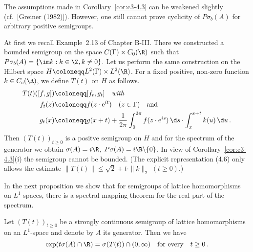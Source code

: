 The assumptions made in Corollary~\ref{cor:c3-4.3} can be weakened slightly (cf.\ [Greiner (1982)]). 
However, one still cannot prove cyclicity of $P\sigma_{b}(A)$ for arbitrary positive semigroups.

\begin{example}\label{ex:c3-4.4}
	At first we recall Example~2.13 of Chapter B-III. 
	There we constructed a bounded semigroup on the space $C(\Gamma)\times C_{0}(\R )$ such that $P\sigma_{b}(A) = \{\im k : k \in \Z, k \neq 0\}$.
%
%
%
Let us perform the same construction on the Hilbert space
$H \coloneqq L^2(\Gamma)\times L^2(\R )$.
For a fixed positive, non-zero function $k \in C_c(\R )$,
we define $T(t)$ on $H$ as follows.
\begin{equation}\label{eq:c3-4.6}
	\begin{aligned} 
		T(t)([f,g]) &\coloneqq [f_t,g_t] \quad \textit{with}\\
		f_t(z) &\coloneqq f(z \cdot \mathrm{e}^{it}) \quad (z \in \Gamma) \quad \text{and}\\
		g_t(x) &\coloneqq g(x+t) + \frac{1}{2\pi}\int_{0}^{2\pi} f(z \cdot \mathrm{e}^{is}) \,\d s \cdot \int_{x}^{x+t} k(u) \,\d u\,.
	\end{aligned}
\end{equation}
Then $(T(t))_{t \geq 0}$ is a positve semigroup on $H$ and for the spectrum of
the generator we obtain $\sigma(A) = i\R $, $P\sigma(A) = i\R \backslash\{0\}$.
In view of Corollary~\ref{cor:c3-4.3}(i) the semigroup cannot be bounded.
(The explicit representation (4.6) only allows the estimate $\|T(t)\| \leq \sqrt{2} + t \cdot \|k\|_2$ $(t\geq 0)$.)
\end{example}

In the next proposition we show that for semigroups of lattice homomorphisms on $L^1$-spaces, there is a spectral mapping theorem for the
real part of the spectrum.

\begin{proposition}\label{prop:c3-4.5}
Let $(T(t))_{t \geq 0}$ be a strongly continuous semigroup
of lattice homomorphisms on an $L^1$-space and denote by $A$ its generator.
Then we have
\begin{equation}\label{eq:c3-4.7}
	\exp(t\sigma(A) \cap \R ) = \sigma(T(t)) \cap (0,\infty) \quad \text{for every} \quad t \geq 0\,.
\end{equation}
\end{proposition}

